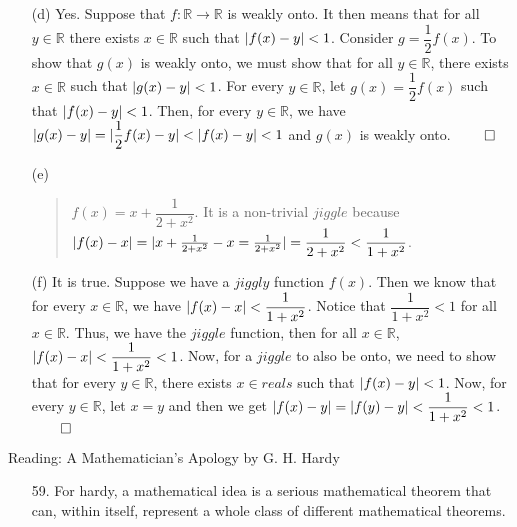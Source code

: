 \documentclass[12pt, a4paper]{article}
\newcommand{\reals}{\mathbb{R}}
\DeclarePairedDelimiter\abs{\lvert}{\rvert}
\newcommand{\rarr}{\rightarrow}
\begin{document}
\begin{itemize}
\begin{itemize}
\item[]

\item[(d)]
Yes. Suppose that $f : \reals \rarr \reals$ is weakly onto. It then means that for all $y \in \reals$
there exists $x \in \reals$ such that $\abs{f(x) - y} < 1$. Consider $g = \dfrac{1}{2} f(x)$.
To show that $g(x)$ is weakly onto, we must show that for all $y \in \reals$, there exists $x \in \reals$
such that $\abs{g(x) - y} < 1$. For every $y \in \reals$, let $g(x) = \dfrac{1}{2}f(x)$ such that $\abs{f(x) - y} < 1$.
Then, for every $y \in \reals$, we have $\abs{g(x) - y} = \abs{\dfrac{1}{2}f(x) - y} < \abs{f(x) - y} < 1$ and $g(x)$ is weakly onto.
$\qed$

\item[]

\item[(e)]
\begin{quote}
$f(x) = x + \dfrac{1}{2 + x^2}$. It is a non-trivial $jiggle$ because $\abs{f(x) - x} = \abs{x + \frac{1}{2 + x^2} - x = \frac{1}{2 + x^2}} = \dfrac{1}{2 + x^2} < \dfrac{1}{1 + x^2}$.
\end{quote}

\item[]

\item[(f)]
It is true. Suppose we have a $jiggly$ function $f(x)$. Then we know that for every $x \in \reals$,
we have $\abs{f(x) - x} < \dfrac{1}{1 + x^2}$. Notice that $\dfrac{1}{1 + x^2} < 1$ for all $x \in \reals$.
Thus, we have the $jiggle$ function, then for all $x \in \reals$, $\abs{f(x) - x} < \dfrac{1}{1 + x^2} < 1$.
Now, for a $jiggle$ to also be onto, we need to show that for every $y \in \reals$, there exists $x \in reals$
such that $\abs{f(x) - y} < 1$. Now, for every $y \in \reals$, let $x = y$ and then
we get $\abs{f(x) - y} = \abs{f(y) - y} < \dfrac{1}{1 + x^2} < 1$.
$\qed$
\end{itemize}
\newpage
{\Large Reading: A Mathematician’s Apology by G. H. Hardy}
\begin{itemize}

\item[]

\item[59.]
For hardy, a mathematical idea is a serious mathematical theorem
that can, within itself, represent a whole class of different mathematical
theorems.

\item[]


\end{itemize}
\end{itemize}
\end{document}
